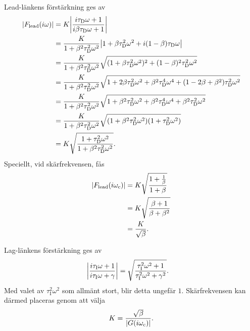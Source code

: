 Lead-länkens förstärkning ges av
\begin{align*}
	\abs{F_{\text{lead}}(i\omega)} &= K\abs{\frac{i\tau_{\text{D}}\omega + 1}{i\beta\tau_{\text{D}}\omega + 1}} \\
	                               &= \frac{K}{1 + \beta^{2}\tau_{\text{D}}^{2}\omega^{2} }\abs{1 + \beta\tau_{\text{D}}^{2}\omega^{2} + i(1 - \beta)\tau_{\text{D}}\omega} \\
	                               &= \frac{K}{1 + \beta^{2}\tau_{\text{D}}^{2}\omega^{2} }\sqrt{(1 + \beta\tau_{\text{D}}^{2}\omega^{2})^{2} + (1 - \beta)^{2}\tau_{\text{D}}^{2}\omega^{2}} \\
	                               &= \frac{K}{1 + \beta^{2}\tau_{\text{D}}^{2}\omega^{2} }\sqrt{1 + 2\beta\tau_{\text{D}}^{2}\omega^{2} + \beta^{2}\tau_{\text{D}}^{4}\omega^{4} + (1 - 2\beta + \beta^{2})\tau_{\text{D}}^{2}\omega^{2}} \\
	                               &= \frac{K}{1 + \beta^{2}\tau_{\text{D}}^{2}\omega^{2} }\sqrt{1 + \beta^{2}\tau_{\text{D}}^{2}\omega^{2} + \beta^{2}\tau_{\text{D}}^{4}\omega^{4} + \beta^{2}\tau_{\text{D}}^{2}\omega^{2}} \\
	                               &= \frac{K}{1 + \beta^{2}\tau_{\text{D}}^{2}\omega^{2} }\sqrt{(1 + \beta^{2}\tau_{\text{D}}^{2}\omega^{2})(1 + \tau_{\text{D}}^{2}\omega^{2})} \\
	                               &= K\sqrt{\frac{1 + \tau_{\text{D}}^{2}\omega^{2}}{1 + \beta^{2}\tau_{\text{D}}^{2}\omega^{2}}}.
\end{align*}
Speciellt, vid skärfrekvensen, fås
\begin{align*}
	\abs{F_{\text{lead}}(i\omega_{\text{c}})} &= K\sqrt{\frac{1 + \frac{1}{\beta}}{1 + \beta}} \\
	                                          &= K\sqrt{\frac{\beta + 1}{\beta + \beta^{2}}} \\
	                                          &= \frac{K}{\sqrt{\beta}}.
\end{align*}

Lag-länkens förstärkning ges av
\begin{align*}
    \abs{\frac{i\tau_{\text{I}}\omega + 1}{i\tau_{\text{I}}\omega + \gamma}} &= \sqrt{\frac{\tau_{\text{I}}^{2}\omega^{2} + 1}{\tau_{\text{I}}^{2}\omega^{2} + \gamma^{2}}}.
\end{align*}
Med valet av $\tau_{\text{I}}^{2}\omega^{2}$ som allmänt stort, blir detta ungefär $1$. Skärfrekvensen kan därmed placeras genom att välja
\begin{align*}
	K = \frac{\sqrt{\beta}}{\abs{G(i\omega_{\text{c}})}}.
\end{align*}